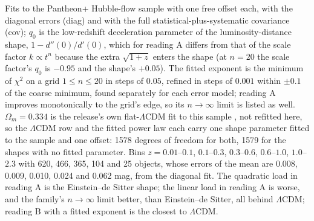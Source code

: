 \documentclass[11pt]{article}
\begin{document}
\begin{table}[H]
\caption{Fits to the Pantheon+ Hubble-flow sample with one free offset each, with the diagonal errors (diag) and with the full statistical-plus-systematic covariance (cov); $q_0$ is the low-redshift deceleration parameter of the luminosity-distance shape, $1 - d''(0)/d'(0)$, which for reading A differs from that of the scale factor $k \propto t^n$ because the extra $\sqrt{1+z}$ enters the shape (at $n = 20$ the scale factor's $q_0$ is $-0.95$ and the shape's $+0.05$). The fitted exponent is the minimum of $\chi^2$ on a grid $1 \le n \le 20$ in steps of $0.05$, refined in steps of $0.001$ within $\pm 0.1$ of the coarse minimum, found separately for each error model; reading A improves monotonically to the grid's edge, so its $n \to \infty$ limit is listed as well. $\Omega_m = 0.334$ is the release's own flat-$\Lambda$CDM fit to this sample \cite{brout2022}, not refitted here, so the $\Lambda$CDM row and the fitted power law each carry one shape parameter fitted to the sample and one offset: 1578 degrees of freedom for both, 1579 for the shapes with no fitted parameter. Bins $z = 0.01$--$0.1$, $0.1$--$0.3$, $0.3$--$0.6$, $0.6$--$1.0$, $1.0$--$2.3$ with 620, 466, 365, 104 and 25 objects, whose errors of the mean are 0.008, 0.009, 0.010, 0.024 and 0.062 mag, from the diagonal fit. The quadratic load in reading A is the Einstein--de Sitter shape; the linear load in reading A is worse, and the family's $n \to \infty$ limit better, than Einstein--de Sitter, all behind $\Lambda$CDM; reading B with a fitted exponent is the closest to $\Lambda$CDM.}
\label{tab:sn}
\end{table}
\end{document}
